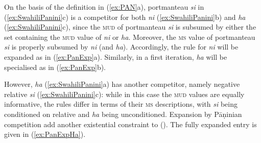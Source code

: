 On the basis of the definition in (\ref{ex:PAN}a), portmanteau
\textit{si} in (\ref{ex:SwahiliPanini}c) is a competitor for both
\textit{ni} (\ref{ex:SwahiliPanini}b) and \textit{ha}
(\ref{ex:SwahiliPanini}c), since the \textsc{mud} of portmanteau
\textit{si} is subsumed by either the set containing the \textsc{mud}
value of \textit{ni} or \textit{ha}. Moreover, the \textsc{ms} value
of portmanteau \textit{si} is properly subsumed by \textit{ni} (and
\textit{ha}). Accordingly, the rule for \textit{ni} will be expanded
as in (\ref{ex:PanExp}a).  Similarly, in a first iteration,
\textit{ha} will be specialised as in (\ref{ex:PanExp}b). 

\begin{exe}
  \ex \label{ex:PanExp}
  \begin{minipage}[t]{0.49\linewidth}
    \begin{xlist}
    \end{xlist}
  \end{minipage}
  \begin{minipage}[t]{0.49\linewidth}
    \begin{xlist}
    \end{xlist}
  \end{minipage}
\end{exe}

However, \textit{ha} (\ref{ex:SwahiliPanini}a) has another competitor,
namely negative relative \textit{si} (\ref{ex:SwahiliPanini}c): while
in this case the \textsc{mud} values are equally informative, the
rules differ in terms of their \textsc{ms} descriptions, with
\textit{si} being conditioned on relative and \textit{ha} being
unconditioned.  Expansion by Pāṇinian competition add another
existential constraint to (). The fully expanded entry is given in
(\ref{ex:PanExpHa}).

